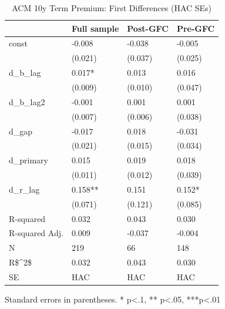 \begin{table}
\caption{ACM 10y Term Premium: First Differences (HAC SEs)}
\label{}
\begin{center}
\begin{tabular}{llll}
\hline
               & Full sample & Post-GFC & Pre-GFC  \\
\hline
const          & -0.008      & -0.038   & -0.005   \\
               & (0.021)     & (0.037)  & (0.025)  \\
d\_b\_lag      & 0.017*      & 0.013    & 0.016    \\
               & (0.009)     & (0.010)  & (0.047)  \\
d\_b\_lag2     & -0.001      & 0.001    & 0.001    \\
               & (0.007)     & (0.006)  & (0.038)  \\
d\_gap         & -0.017      & 0.018    & -0.031   \\
               & (0.021)     & (0.015)  & (0.034)  \\
d\_primary     & 0.015       & 0.019    & 0.018    \\
               & (0.011)     & (0.012)  & (0.039)  \\
d\_r\_lag      & 0.158**     & 0.151    & 0.152*   \\
               & (0.071)     & (0.121)  & (0.085)  \\
R-squared      & 0.032       & 0.043    & 0.030    \\
R-squared Adj. & 0.009       & -0.037   & -0.004   \\
N              & 219         & 66       & 148      \\
R\$^2\$        & 0.032       & 0.043    & 0.030    \\
SE             & HAC         & HAC      & HAC      \\
\hline
\end{tabular}
\end{center}
\end{table}
\bigskip
Standard errors in parentheses. \newline 
* p<.1, ** p<.05, ***p<.01
